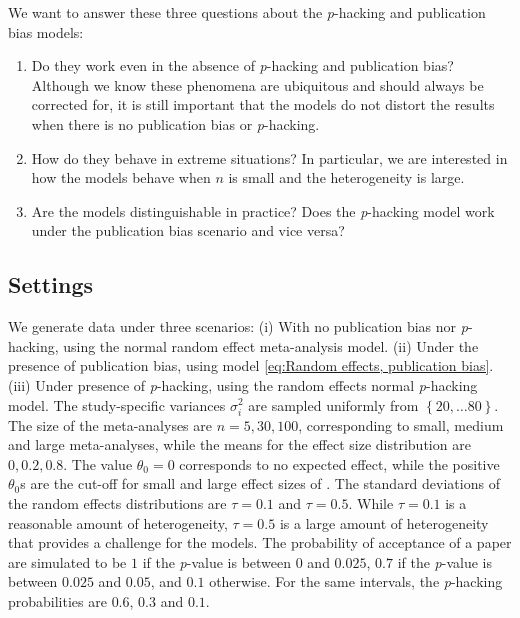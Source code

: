 \documentclass[useAMS,usenatbib,referee]{biom}
\begin{document}
%
%
We want to answer these three questions about the \textit{p}-hacking and publication bias models:
\begin{enumerate}
\item Do they work even in the absence of \textit{p}-hacking and publication bias? Although we know these phenomena are ubiquitous and should always be corrected for, it is still important that the models do not distort the results when there is no publication bias or \textit{p}-hacking.
\item How do they behave in extreme situations? In particular, we are interested in how the models behave when $n$ is small and the heterogeneity is large.
\item Are the models distinguishable in practice? Does the \textit{p}-hacking model work under the publication bias scenario and vice versa?
\end{enumerate}

\subsection{Settings}
We generate data under three scenarios: (i) With no publication bias nor \textit{p}-hacking, using the normal random effect meta-analysis model. (ii) Under the presence of publication bias, using model \eqref{eq:Random effects, publication bias}. (iii) Under presence of \textit{p}-hacking, using the random effects normal \textit{p}-hacking model. The study-specific variances $\sigma_{i}^{2}$ are sampled uniformly from $\left\{ 20,\ldots80\right\} $. The size of the meta-analyses are $n = 5, 30, 100$, corresponding to small, medium and large meta-analyses, while the means for the effect size distribution are $0, 0.2, 0.8$. The value $\theta_0 = 0$ corresponds to no expected effect, while the positive $\theta_0$s are the cut-off for small and large effect sizes of \citet[][pages 24 -- 27]{cohen1988statistical}. The standard deviations of the random effects distributions are $\tau=0.1$ and $\tau=0.5$. While $\tau = 0.1$ is a reasonable amount of heterogeneity, $\tau=0.5$ is a large amount of heterogeneity that provides a challenge for the models. The probability of acceptance of a paper are simulated to be $1$ if the \textit{p}-value is between $0$ and $0.025$, $0.7$ if the \textit{p}-value is between $0.025$ and $0.05$, and $0.1$ otherwise. For the same intervals, the \textit{p}-hacking probabilities are $0.6$, $0.3$ and $0.1$. 
\end{document}
